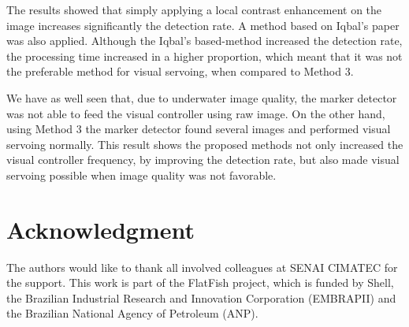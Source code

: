 \documentclass[conference, letterpaper]{IEEEtran}
\begin{document}
The results showed that simply applying a local contrast enhancement on the
image increases significantly the detection rate. A method based on Iqbal's
paper was also applied. Although the Iqbal's based-method increased the
detection rate, the processing time increased in a higher proportion, which
meant that it was not the preferable method for visual servoing, when compared to
Method 3.

We have as well seen that, due to underwater image quality, the marker
detector was not able to feed the visual controller using raw image. On the
other hand, using Method 3 the marker detector found several images and
performed visual servoing normally. This result shows the proposed methods not
only increased the visual controller frequency, by improving the
detection rate, but also made visual servoing possible when image
quality was not favorable.

\section*{Acknowledgment}

The authors would like to thank all involved colleagues at SENAI CIMATEC for
the support. This work is part of the FlatFish project, which is funded by
Shell, the Brazilian Industrial Research and Innovation Corporation (EMBRAPII)
and the Brazilian National Agency of Petroleum (ANP).






\end{document}
